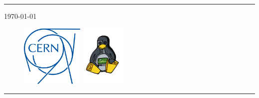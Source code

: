 \begin{titlepage}

\vspace*{3cm}


\noindent \rule{\textwidth}{.1cm}

\hfill\today

\vspace*{3cm}

\begin{figure}[h]
  \includegraphics[height=3cm]{fig/cern-logo}
  \hfill
  \includegraphics[height=3cm]{fig/ohwr-logo}
\end{figure}

\vfill


\noindent \rule{\textwidth}{.05cm}

\end{titlepage}
